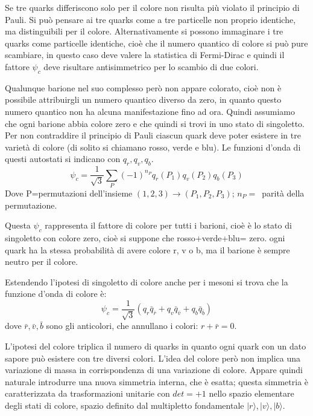 Se tre quarks differiscono solo per il colore non risulta più violato il principio di Pauli.
Si può pensare ai tre quarks come a tre particelle non proprio identiche, ma distinguibili per il colore.
Alternativamente si possono immaginare i tre quarks come particelle identiche, cioè che il numero quantico di
colore si può pure scambiare, in questo caso deve valere la statistica di Fermi-Dirac e quindi il fattore $\psi_c$
deve risultare antisimmetrico per lo scambio di due colori.

Qualunque barione nel suo complesso però non appare colorato, cioè non è possibile attribuirgli un numero
quantico diverso da zero, in quanto questo numero quantico non ha alcuna manifestazione fino ad ora. Quindi
assumiamo che ogni barione abbia colore zero e che quindi si trovi in uno stato di singoletto.
Per non contraddire il principio di Pauli ciascun quark deve poter esistere in tre varietà di colore (di solito si
chiamano rosso, verde e blu).
Le funzioni d'onda di questi autostati si indicano con $q_r,q_v,q_b$.
\begin{equation}
\psi_c=\frac{1}{\sqrt{3}}\sum_P(-1)^{n_P}q_r(P_1)q_v(P_2)q_b(P_3)
\end{equation}
Dove P=permutazioni dell'insieme $(1,2,3)\rightarrow(P_1,P_2,P_3)$; $n_P=\,$ parità della permutazione.

Questa $\psi_c$ rappresenta il fattore di colore per tutti i barioni, cioè è lo stato di singoletto con colore
zero, cioè si suppone che rosso+verde+blu= zero.
ogni quark ha la stessa probabilità di avere colore r, v o b, ma il barione è sempre neutro per il colore.

Estendendo l'ipotesi di singoletto di colore anche per i mesoni si trova che la funzione d'onda di colore è:
\begin{equation}
\psi_c=\frac{1}{\sqrt{3}}(q_r\bar{q}_{\bar{r}}+q_v\bar{q}_{\bar{v}}+q_b\bar{q}_{\bar{b}})
\end{equation}
dove $\bar{r},\bar{v},\bar{b}$ sono gli anticolori, che annullano i colori: $r+\bar{r}=0$.

L'ipotesi del colore triplica il numero di quarks in quanto ogni quark con un dato sapore può esistere con tre diversi colori.
L'idea del colore però non implica una variazione di massa in corrispondenza di una variazione di colore.
Appare quindi naturale introdurre una nuova simmetria interna, che è esatta; questa simmetria è caratterizzata
da trasformazioni unitarie con $det=+1$ nello spazio elementare degli stati di colore, spazio definito dal
multipletto fondamentale $|r\rangle,|v\rangle,|b\rangle$.

